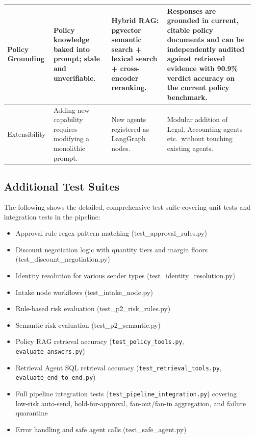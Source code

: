 \documentclass[11pt]{article}
\begin{document}
\begin{tabular}{|p{2.2cm}|p{3.8cm}|p{3.8cm}|p{4.6cm}|}
\hline
Policy Grounding
  & Policy knowledge baked into prompt; stale and unverifiable.
  & Hybrid RAG: pgvector semantic search + lexical search + cross-encoder reranking.
  & Responses are grounded in current, citable policy documents and can be independently audited against retrieved evidence with 90.9\% verdict accuracy on the current policy benchmark. \\
\hline
Extensibility
  & Adding new capability requires modifying a monolithic prompt.
  & New agents registered as LangGraph nodes.
  & Modular addition of Legal, Accounting agents etc.\ without touching existing agents. \\
\hline
\end{tabular}

\subsection{Additional Test Suites}

The following shows the detailed, comprehensive test suite covering unit tests and integration tests in the pipeline:

\begin{itemize}
\item Approval rule regex pattern matching (test\_approval\_rules.py)

\item Discount negotiation logic with quantity tiers and margin floors (test\_discount\_negotiation.py)

\item Identity resolution for various sender types (test\_identity\_resolution.py)

\item Intake node workflows (test\_intake\_node.py)

\item Rule-based risk evaluation (test\_p2\_risk\_rules.py)

\item Semantic risk evaluation (test\_p2\_semantic.py)

\item Policy RAG retrieval accuracy (\texttt{test\_policy\_tools.py}, \texttt{evaluate\_answers.py})

\item Retrieval Agent SQL retrieval accuracy (\texttt{test\_retrieval\_tools.py}, \texttt{evaluate\_end\_to\_end.py})

\item Full pipeline integration tests (\texttt{test\_pipeline\_integration.py}) covering low-risk auto-send, hold-for-approval, fan-out/fan-in aggregation, and failure quarantine

\item Error handling and safe agent calls (test\_safe\_agent.py)
\end{itemize}
\end{document}
